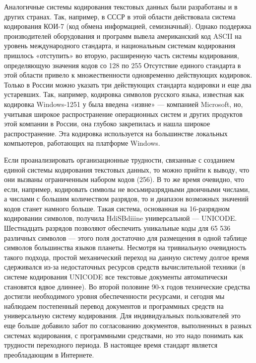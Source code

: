 \documentclass[a4paper]{article}
\begin{document}
Аналогичные системы кодирования текстовых данных были разработаны и в других странах. Так, например, в СССР в этой области действовала система кодирования КОИ-7 (код обмена информацией, семизначный). Однако поддержка производителей оборудования и программ вывела американский код ASCII на уровень международного стандарта, и национальным системам кодирования пришлось «отступить» во вторую, расширенную часть системы кодирования, определяющую значения кодов со 128 по 255 Отсутствие единого стандарта в этой области привело к множественности одновременно действующих кодировок. Только в России можно указать три действующих стандарта кодировки и еще два устаревших. Так, например, кодировка символов русского языка, известная как кодировка Windows-1251 у была введена «извне» — компанией Microsoft, но, учитывая широкое распространение операционных систем и других продуктов этой компании в России, она глубоко закрепилась и нашла широкое распространение. Эта кодировка используется на большинстве локальных компьютеров, работающих на
платформе Windows.

Если проанализировать организационные трудности, связанные с созданием единой системы кодирования текстовых данных, то можно прийти к выводу, что они вызваны ограниченным набором кодов (256). В то же время очевидно, что если, например, кодировать символы не восьмиразрядными двоичными числами, а числами с большим количеством разрядов, то и диапазон возможных значений кодов станет намного больше. Такая система, основанная на 16-разрядном кодировании символов, получила HdiSBdiiine универсальной — UNICODE. Шестнадцать разрядов позволяют обеспечить уникальные коды для 65 536 различных символов — этого поля достаточно для размещения в одной таблице символов большинства языков планеты. Несмотря на тривиальную очевидность такого подхода, простой механический переход на данную систему долгое время сдерживался из-за недостаточных ресурсов средств вычислительной техники (в системе кодирования UNICODE все текстовые документы автоматически становятся вдвое длиннее). Во второй половине 90-х годов технические средства достигли необходимого уровня обеспеченности ресурсами, и сегодня мы наблюдаем постепенный перевод документов и программных средств на универсальную систему кодирования. Для индивидуальных пользователей это еще больше добавило забот по согласованию документов, выполненных в разных системах кодирования, с программными средствами, но это надо понимать как трудности переходного периода. В настоящее время стандарт является преобладающим в Интернете.
\end{document}
